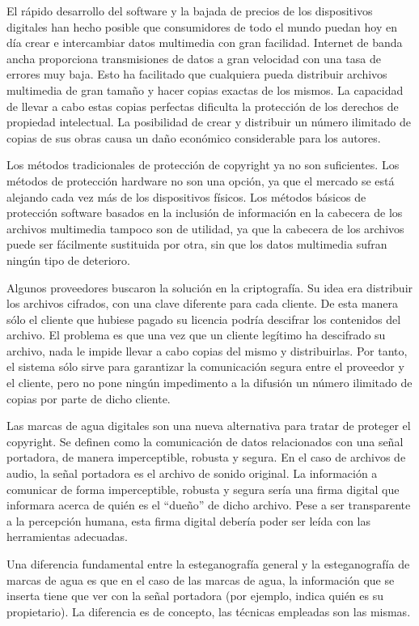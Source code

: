 \documentclass[12pt]{article}
\begin{document}
El rápido desarrollo del software y la bajada de precios de los dispositivos digitales han hecho posible que consumidores de todo el mundo puedan hoy en día crear e intercambiar datos multimedia con gran facilidad. Internet de banda ancha proporciona transmisiones de datos a gran velocidad con una tasa de errores muy baja. Esto ha facilitado que cualquiera pueda distribuir archivos multimedia de gran tamaño y hacer copias exactas de los mismos. La capacidad de llevar a cabo estas copias perfectas dificulta la protección de los derechos de propiedad intelectual. La posibilidad de crear y distribuir un número ilimitado de copias de sus obras causa un daño económico considerable para los autores.

Los métodos tradicionales de protección de copyright ya no son suficientes. Los métodos de protección hardware no son una opción, ya que el mercado se está alejando cada vez más de los dispositivos físicos. Los métodos básicos de protección software basados en la inclusión de información en la cabecera de los archivos multimedia tampoco son de utilidad, ya que la cabecera de los archivos puede ser fácilmente sustituida por otra, sin que los datos multimedia sufran ningún tipo de deterioro.

Algunos proveedores buscaron la solución en la criptografía. Su idea era distribuir los archivos cifrados, con una clave diferente para cada cliente. De esta manera sólo el cliente que hubiese pagado su licencia podría descifrar los contenidos del archivo. El problema es que una vez que un cliente legítimo ha descifrado su archivo, nada le impide llevar a cabo copias del mismo y distribuirlas. Por tanto, el sistema sólo sirve para garantizar la comunicación segura entre el proveedor y el cliente, pero no pone ningún impedimento a la difusión un número ilimitado de copias por parte de dicho cliente.

Las marcas de agua digitales son una nueva alternativa para tratar de proteger el copyright. Se definen como la comunicación de datos relacionados con una señal portadora, de manera imperceptible, robusta y segura. En el caso de archivos de audio, la señal portadora es el archivo de sonido original. La información a comunicar de forma imperceptible, robusta y segura sería una firma digital que informara acerca de quién es el ``dueño'' de dicho archivo. Pese a ser transparente a la percepción humana, esta firma digital debería poder ser leída con las herramientas adecuadas.

Una diferencia fundamental entre la esteganografía general y la esteganografía de marcas de agua es que en el caso de las marcas de agua, la información que se inserta tiene que ver con la señal portadora (por ejemplo, indica quién es su propietario). La diferencia es de concepto, las técnicas empleadas son las mismas.
\end{document}
